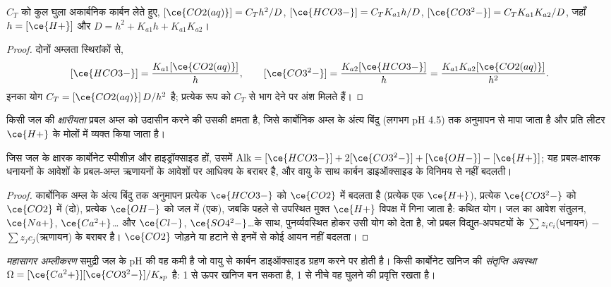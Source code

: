 \begin{proposition}[कार्बोनेट अंश]\label{prop:b3:environmental-toxicology:carbonate-fractions}
$C_T$ को कुल घुला अकार्बनिक कार्बन लेते हुए,
$[\ce{CO2(aq)}] = C_Th^2/D$, $[\ce{HCO3-}] = C_TK_{a1}h/D$, $[\ce{CO3^2-}] = C_TK_{a1}K_{a2}/D$, जहाँ $h = [\ce{H+}]$ और $D = h^2 + K_{a1}h + K_{a1}K_{a2}$।
\end{proposition}

\begin{proof}
दोनों अम्लता स्थिरांकों से,
\[
  [\ce{HCO3-}] = \frac{K_{a1}[\ce{CO2(aq)}]}{h}, \qquad [\ce{CO3^2-}] = \frac{K_{a2}[\ce{HCO3-}]}{h} = \frac{K_{a1}K_{a2}[\ce{CO2(aq)}]}{h^2}.
\]
इनका योग $C_T = [\ce{CO2(aq)}]\,D/h^2$ है; प्रत्येक रूप को $C_T$ से भाग देने पर अंश मिलते हैं।
\end{proof}

\begin{definition}[क्षारीयता]\label{def:b3:environmental-toxicology:alkalinity}
किसी जल की \emph{क्षारीयता} प्रबल अम्ल को उदासीन करने की
उसकी क्षमता है, जिसे कार्बोनिक अम्ल के अंत्य बिंदु (लगभग pH
4.5) तक अनुमापन से मापा जाता है और प्रति लीटर $\ce{H+}$ के मोलों में व्यक्त किया जाता है।
\end{definition}

\begin{proposition}[कार्बोनेट क्षारीयता]\label{prop:b3:environmental-toxicology:alkalinity}
जिस जल के क्षारक कार्बोनेट स्पीशीज़ और हाइड्रॉक्साइड हों, उसमें
$\mathrm{Alk} = [\ce{HCO3-}] + 2[\ce{CO3^2-}] + [\ce{OH-}] - [\ce{H+}]$; यह प्रबल-क्षारक धनायनों के आवेशों के
प्रबल-अम्ल ऋणायनों के आवेशों पर आधिक्य के बराबर है, और वायु के साथ कार्बन डाइऑक्साइड
के विनिमय से नहीं बदलती।
\end{proposition}

\begin{proof}
कार्बोनिक अम्ल के अंत्य बिंदु तक अनुमापन प्रत्येक $\ce{HCO3-}$ को $\ce{CO2}$ में बदलता है (प्रत्येक एक $\ce{H+}$),
प्रत्येक $\ce{CO3^2-}$ को $\ce{CO2}$ में (दो), प्रत्येक $\ce{OH-}$ को जल में (एक), जबकि पहले से उपस्थित मुक्त $\ce{H+}$
विपक्ष में गिना जाता है: कथित योग। जल का आवेश संतुलन,
$\ce{Na+}$, $\ce{Ca^2+}$\dots{} और $\ce{Cl-}$, $\ce{SO4^2-}$\dots के साथ, पुनर्व्यवस्थित होकर उसी योग को देता है, जो प्रबल विद्युत-अपघट्यों के $\sum z_i c_i$(धनायन) $-$ $\sum z_jc_j$(ऋणायन)
के बराबर है। $\ce{CO2}$ जोड़ने या हटाने से इनमें से कोई आयन नहीं बदलता।
\end{proof}

\begin{definition}[महासागर अम्लीकरण]\label{def:b3:environmental-toxicology:acidification}
\emph{महासागर अम्लीकरण} समुद्री जल के pH की वह कमी है
जो वायु से कार्बन डाइऑक्साइड ग्रहण करने पर होती है। किसी कार्बोनेट खनिज की \emph{संतृप्ति
अवस्था}
$\Omega = [\ce{Ca^2+}][\ce{CO3^2-}]/K_{sp}$ है: 1 से ऊपर खनिज बन सकता है, 1 से नीचे वह घुलने की प्रवृत्ति रखता है।
\end{definition}

